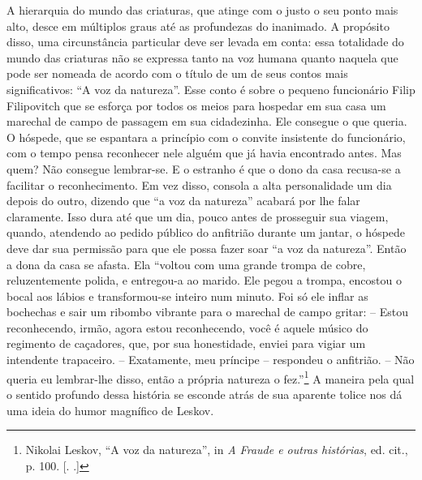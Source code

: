 A hierarquia do mundo das criaturas, que atinge com o justo o seu ponto
mais alto, desce em múltiplos graus até as profundezas do inanimado. A
propósito disso, uma circunstância particular deve ser levada em conta:
essa totalidade do mundo das criaturas não se expressa tanto na voz
humana quanto naquela que pode ser nomeada de acordo com o título de um
de seus contos mais significativos: ``A voz da natureza''. Esse conto é
sobre o pequeno funcionário Filip Filipovitch que se esforça por todos
os meios para hospedar em sua casa um marechal de campo de passagem em
sua cidadezinha. Ele consegue o que queria. O hóspede, que se espantara
a princípio com o convite insistente do funcionário, com o tempo pensa
reconhecer nele alguém que já havia encontrado antes. Mas quem? Não
consegue lembrar-se. E o estranho é que o dono da casa recusa-se a
facilitar o reconhecimento. Em vez disso, consola a alta personalidade
um dia depois do outro, dizendo que ``a voz da natureza'' acabará por
lhe falar claramente. Isso dura até que um dia, pouco antes de
prosseguir sua viagem, quando, atendendo ao pedido público do anfitrião
durante um jantar, o hóspede deve dar sua permissão para que ele possa
fazer soar ``a voz da natureza''. Então a dona da casa se afasta. Ela
``voltou com uma grande trompa de cobre, reluzentemente polida, e
entregou-a ao marido. Ele pegou a trompa, encostou o bocal aos lábios e
transformou-se inteiro num minuto. Foi só ele inflar as bochechas e sair
um ribombo vibrante para o marechal de campo gritar: -- Estou
reconhecendo, irmão, agora estou reconhecendo, você é aquele músico do
regimento de caçadores, que, por sua honestidade, enviei para vigiar um
intendente trapaceiro. -- Exatamente, meu príncipe -- respondeu o
anfitrião. -- Não queria eu lembrar-lhe disso, então a própria natureza
o fez.''\footnote{Nikolai Leskov, ``A voz da natureza'', in \emph{A
  Fraude e outras histórias}, ed. cit., p. 100. [. .]} A
maneira pela qual o sentido profundo dessa história se esconde atrás de
sua aparente tolice nos dá uma ideia do humor magnífico de Leskov.

